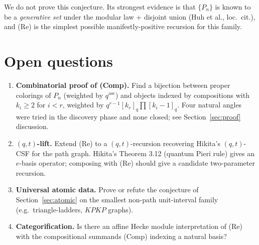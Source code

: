 \documentclass[11pt,a4paper]{amsart}
\theoremstyle{definition}
\DeclareMathOperator{\asc}{asc}
\newcommand{\Path}{P}
\newcommand{\qint}[1]{[#1]_q}
\begin{document}
We do not prove this conjecture. Its strongest evidence is that
$\{\Path_n\}$ is known to be a \emph{generative set} under the modular
law + disjoint union (Huh et al., loc.\ cit.), and (Re) is the
simplest possible manifestly-positive recursion for this family.

\section{Open questions}\label{sec:open}

\begin{enumerate}[label=\textup{Q\arabic*.},leftmargin=*]
  \item \textbf{Combinatorial proof of (Comp).} Find a bijection between
        proper colorings of $\Path_n$ (weighted by $q^{\asc}$) and
        objects indexed by compositions with $k_i \ge 2$ for $i < r$,
        weighted by $q^{r-1}\qint{k_r}\prod \qint{k_i - 1}$. Four
        natural angles were tried in the discovery phase and none
        closed; see Section~\ref{sec:proof} discussion.
  \item \textbf{$(q,t)$-lift.} Extend (Re) to a $(q,t)$-recursion
        recovering Hikita's $(q,t)$-CSF for the path graph. Hikita's
        Theorem 3.12 (quantum Pieri rule) gives an $e$-basis operator;
        composing with (Re) should give a candidate two-parameter
        recursion.
  \item \textbf{Universal atomic data.} Prove or refute the conjecture
        of Section~\ref{sec:atomic} on the smallest non-path unit-interval
        family (e.g.\ triangle-ladders, $KPKP$ graphs).
  \item \textbf{Categorification.} Is there an affine Hecke module
        interpretation of (Re) with the compositional summands (Comp)
        indexing a natural basis?
\end{enumerate}
\end{document}
